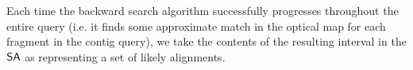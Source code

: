 Each time the backward search algorithm successfully progresses throughout the entire query (i.e. it finds some approximate match in the optical map for each fragment in the contig query), we take the contents of the resulting interval in the $\mbox{\rm {\sf SA}}$ as representing a set of likely alignments.










\renewcommand{\algorithmiccomment}[1]{\hskip0em$\triangleright$ #1}

